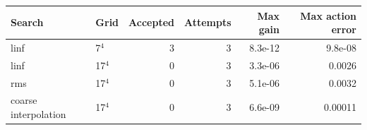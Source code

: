 \begin{tabular}{llrrrr}\toprule
Search & Grid & Accepted & Attempts & Max gain & Max action error \\\midrule
linf & 7$^4$ & 3 & 3 & 8.3e-12 & 9.8e-08 \\
linf & 17$^4$ & 0 & 3 & 3.3e-06 & 0.0026 \\
rms & 17$^4$ & 0 & 3 & 5.1e-06 & 0.0032 \\
coarse interpolation & 17$^4$ & 0 & 3 & 6.6e-09 & 0.00011 \\
\bottomrule\end{tabular}
